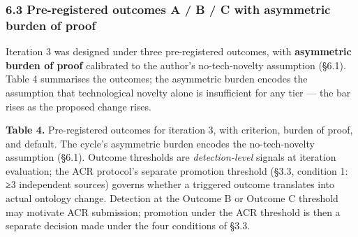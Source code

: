 \documentclass[
]{article}
\begin{document}
\subsubsection{6.3 Pre-registered outcomes A / B / C with asymmetric
burden of
proof}\label{pre-registered-outcomes-a-b-c-with-asymmetric-burden-of-proof}

Iteration 3 was designed under three pre-registered outcomes, with
\textbf{asymmetric burden of proof} calibrated to the author's
no-tech-novelty assumption (§6.1). Table 4 summarises the outcomes; the
asymmetric burden encodes the assumption that technological novelty
alone is insufficient for any tier --- the bar rises as the proposed
change rises.

\textbf{Table 4.} Pre-registered outcomes for iteration 3, with
criterion, burden of proof, and default. The cycle's asymmetric burden
encodes the no-tech-novelty assumption (§6.1). Outcome thresholds are
\emph{detection-level} signals at iteration evaluation; the ACR
protocol's separate promotion threshold (§3.3, condition 1: ≥3
independent sources) governs whether a triggered outcome translates into
actual ontology change. Detection at the Outcome B or Outcome C
threshold may motivate ACR submission; promotion under the ACR threshold
is then a separate decision made under the four conditions of §3.3.
\end{document}
